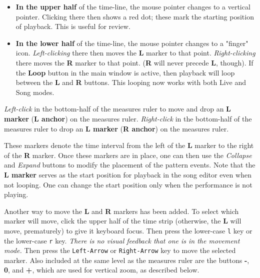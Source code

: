    \begin{itemize}
      \item \textbf{In the upper half} of the time-line,
         the mouse pointer changes to a vertical pointer.
         Clicking there then shows a red dot; these mark
         the starting position of playback.
         This is useful for review.
      \item \textbf{In the lower half} of the time-line,
         the mouse pointer changes to a "finger" icon.
         \textsl{Left-clicking} there then moves the \textbf{L}
         marker to that point.
         \textsl{Right-clicking} there moves the \textbf{R} marker to that point.
         (\textbf{R} will never precede \textbf{L}, though).
         If the \textbf{Loop} button in the main window is active, then
         playback will loop between the \textbf{L} and \textbf{R} buttons.
         This looping now works with both Live and Song modes.
   \end{itemize}

   \textsl{Left-click} in the bottom-half of the
   measures ruler to move and drop an
   \textbf{L marker} (\textbf{L anchor}) on the measures ruler.
   \textsl{Right-click} in the bottom-half of the measures ruler to drop an
   \textbf{L marker} (\textbf{R anchor}) on the measures ruler.
   
   These markers denote the time interval from the left of the 
   \textbf{L} marker to the right of the \textbf{R} marker.
   Once these markers are in place, one can then use
	the \textsl{Collapse} and \textsl{Expand} buttons to modify the
   placement of the pattern events.
   Note that the \textbf{L marker} serves as the start position for playback
   in the song editor even when not looping.
   One can change the start position only when the
   performance is not playing.

   Another way to move the \textbf{L} and \textbf{R} markers has been added.
   To select which marker will move, click the upper half of the time
   strip (otherwise, the \textbf{L} will move,
   prematurely) to give it keyboard focus.
   Then press the lower-case
   \texttt{l} key or the lower-case
   \texttt{r} key.
   \textsl{There is no visual feedback that one is in the movement mode.}
   Then press the \texttt{Left-Arrow} or \texttt{Right-Arrow}
   key to move the selected marker.
   Also included at the same level as the measures ruler are the buttons
   \textbf{-}, \textbf{0}, and \textbf{+},
   which are used for vertical zoom, as described below.

